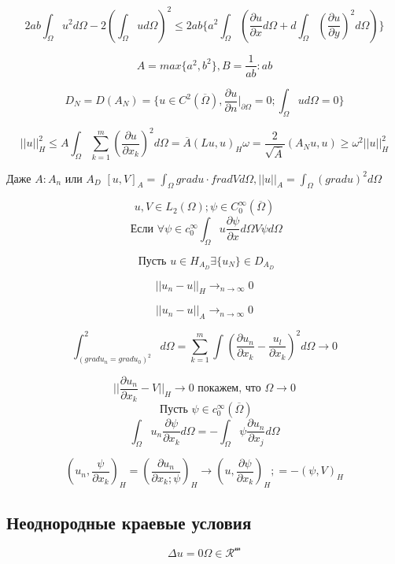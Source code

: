 \documentclass[12pt, a4paper]{article}
\begin{document}
\[ 2 ab \int_{\Omega}^{} u^2 d\Omega -2 (\int_{\Omega}^{} u d\Omega)^2 \leq 2ab \{a^2 \int_{\Omega}^{}(\frac{\partial u}{\partial x} d\Omega + d \int_{\Omega}^{} (\frac{\partial u}{\partial y})^2 d\Omega) \} \]

\[ A = max \{a^2, b^2\}, B = \frac{1}{ab} : ab \]

\[ D_N = D(A_N) = \{ u \in C^2(\overline{\Omega}), \frac{\partial u}{\partial n} |_{\partial  \Omega} = 0; \int_{\Omega}^{} u d\Omega = 0 \} \]

\[ {||u||}^2_H \leq A \int_{\Omega}^{} \sum_{k=1}^{m} (\frac{\partial u}{\partial x_k})^2 d\Omega = \overline{ A} (Lu, u)_H \omega = \frac{2}{\sqrt{ \overline{ A}}} (A_Nu, u) \geq \omega^2 {||u||}^2_H\]

Даже $ A: A_n $ или $ A_D $ $ [u, V]_A = \int_{\Omega}^{} grad u \cdot frad V d\Omega, ||u||_A = \int_{\Omega}^{} (grad u )^2 d \Omega $

\[ u, V \in L_2 (\Omega) ; \psi \in C^{\infty}_0 (\overline{ \Omega}) \]
\[ \textrm{ Если } \forall \psi \in c^{\infty}_0 \int_{\Omega}^{} u \frac{\partial \psi}{\partial x} d\Omega V \psi d \Omega \]

\[ \textrm{ Пусть  } u \in H_{A_D} \exists \{u_N\}\in D_{A_{D}} \]

\[ {||u_n - u||}_H \rightarrow_{n\rightarrow \infty} 0 \]

\[ {||u_n - u||}_A \rightarrow_{n \rightarrow \infty} 0 \]

\[ \int_{{(grad u_n = grad u_0)}^2}^2 d\Omega = \sum_{k=1}^{m} \int_{}(\frac{\partial  u_n}{\partial  x_k} - \frac{u_l}{\partial x_k})^2 d \Omega \rightarrow 0 \]

\[ || \frac{\partial u_n}{\partial x_k} - V||_H \rightarrow 0 \textrm{ покажем, что  } \Omega \rightarrow 0 \]
\[ \textrm{ Пусть } \psi \in c^{\infty}_{0} ( \overline{\Omega}) \]
\[ \int_{\Omega}^{} u_n \frac{\partial \psi}{\partial x_k} d\Omega = - \int_{\Omega}^{} \psi \frac{\partial u_n}{\partial x_j} d\Omega \]

\[ (u_n, \frac{\psi}{\partial  x_k})_H = (\frac{\partial  u_n}{\partial x_k; \psi})_H \rightarrow (u, \frac{\partial  \psi}{\partial  x_k})_H; = -(\psi, V)_H \]

\subsection{Неоднородные краевые условия}

\[ \Delta u = 0 \label{7_1} \Omega \in \mathcal{R^m}\]
\end{document}
